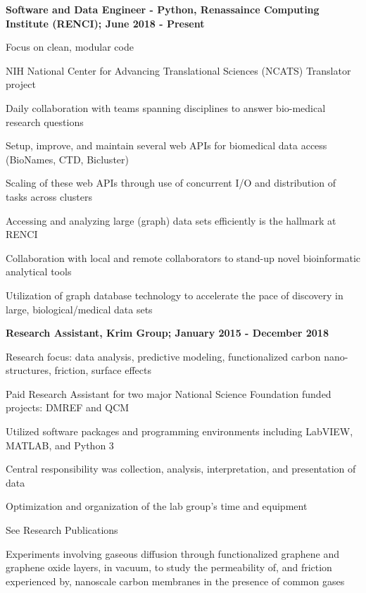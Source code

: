 \documentclass[letterpaper,final]{memoir}
\newcommand{\Sep}{\vspace{1.0em}}
\newcommand{\SmallSep}{\vspace{0.4em}}
\newcommand{\CVItem}[1]
	{\textbf{\color{Blue} #1}}
\begin{document}
\CVItem{Software and Data Engineer - Python, Renassaince Computing Institute (RENCI); June 2018 - Present}
\begin{compactitem}[\color{Blue}$\circ$]
    
    \SmallSep
    \item Focus on clean, modular code
    \item NIH National Center for Advancing Translational Sciences (NCATS) Translator project
    \item Daily collaboration with teams spanning disciplines to answer bio-medical research questions
    \item Setup, improve, and maintain several web APIs for biomedical data access (BioNames, CTD, Bicluster)
    \item Scaling of these web APIs through use of concurrent I/O and distribution of tasks across clusters
    \item Accessing and analyzing large (graph) data sets efficiently is the hallmark at RENCI
    \item Collaboration with local and remote collaborators to stand-up novel bioinformatic analytical tools
    \item Utilization of graph database technology to accelerate the pace of discovery in large, biological/medical data sets
\end{compactitem}

\Sep

\CVItem{Research Assistant, Krim Group; January 2015 - December 2018} 
\begin{compactitem}[\color{Blue}$\circ$]
   
    \SmallSep

    \item Research focus: data analysis, predictive modeling, functionalized carbon nano-structures, friction, surface effects
    \item Paid Research Assistant for two major National Science Foundation funded projects: DMREF and QCM
    \item Utilized software packages and programming environments including LabVIEW, MATLAB, and Python 3
    \item Central responsibility was collection, analysis, interpretation, and presentation of data
    \item Optimization and organization of the lab group's time and equipment
    \item See Research Publications
    \item Experiments involving gaseous diffusion through functionalized graphene and graphene oxide layers, in vacuum,
    to study the permeability of, and friction experienced by, nanoscale carbon membranes in the presence of common gases

\end{compactitem}
\end{document}
